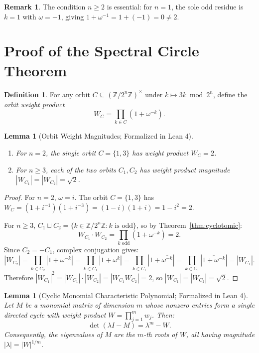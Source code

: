 \documentclass[11pt,reqno]{amsart}
\newtheorem{lemma}[theorem]{Lemma}
\theoremstyle{definition}
\newtheorem{definition}[theorem]{Definition}
\newtheorem{remark}[theorem]{Remark}
\begin{document}
\begin{remark}
The condition $n \ge 2$ is essential: for $n = 1$, the sole odd residue is $k = 1$ with $\omega = -1$, giving $1 + \omega^{-1} = 1 + (-1) = 0 \ne 2$.
\end{remark}

\section{Proof of the Spectral Circle Theorem}

\begin{definition}
For any orbit $C \subseteq (\mathbb{Z}/2^n\mathbb{Z})^\times$ under $k \mapsto 3k \bmod 2^n$, define the \emph{orbit weight product}
\[
W_C = \prod_{k \in C} (1 + \omega^{-k}).
\]
\end{definition}

\begin{lemma}[Orbit Weight Magnitudes; Formalized in Lean 4]\label{lem:orbit-weight}
\begin{enumerate}
\item For $n = 2$, the single orbit $C = \{1, 3\}$ has weight product $W_C = 2$.
\item For $n \ge 3$, each of the two orbits $C_1, C_2$ has weight product magnitude $|W_{C_1}| = |W_{C_2}| = \sqrt{2}$.
\end{enumerate}
\end{lemma}

\begin{proof}
For $n = 2$, $\omega = i$. The orbit $C = \{1, 3\}$ has $W_C = (1 + i^{-1})(1 + i^{-3}) = (1 - i)(1 + i) = 1 - i^2 = 2$.

For $n \ge 3$, $C_1 \sqcup C_2 = \{k \in \mathbb{Z}/2^n\mathbb{Z} : k \text{ is odd}\}$, so by Theorem~\ref{thm:cyclotomic}:
\[
W_{C_1} \cdot W_{C_2} = \prod_{k \text{ odd}} (1 + \omega^{-k}) = 2.
\]
Since $C_2 = -C_1$, complex conjugation gives:
\[
|W_{C_2}| = \prod_{k \in C_2} |1 + \omega^{-k}| = \prod_{k \in C_1} |1 + \omega^k| = \prod_{k \in C_1} |1 + \overline{\omega^{-k}}| = \prod_{k \in C_1} |\overline{1 + \omega^{-k}}| = |W_{C_1}|.
\]
Therefore $|W_{C_1}|^2 = |W_{C_1}| \cdot |W_{C_2}| = |W_{C_1} W_{C_2}| = 2$, so $|W_{C_1}| = |W_{C_2}| = \sqrt{2}$.
\end{proof}

\begin{lemma}[Cyclic Monomial Characteristic Polynomial; Formalized in Lean 4]\label{lem:cyclic-monomial}
Let $M$ be a monomial matrix of dimension $m$ whose nonzero entries form a single directed cycle with weight product $W = \prod_{j=1}^m w_j$. Then:
\[
\det(\lambda I - M) = \lambda^m - W.
\]
Consequently, the eigenvalues of $M$ are the $m$-th roots of $W$, all having magnitude $|\lambda| = |W|^{1/m}$.
\end{lemma}
\end{document}
